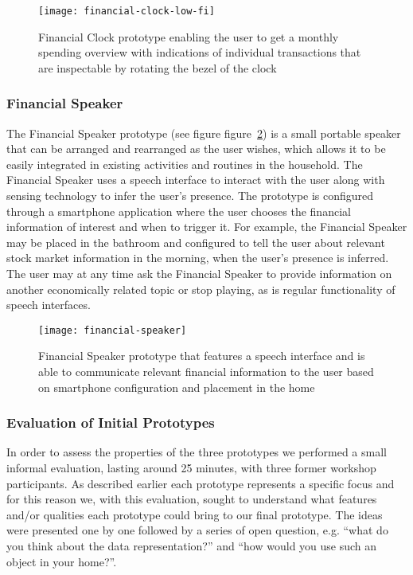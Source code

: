 \begin{figure}[h]
	\centering
	\texttt{[image: financial-clock-low-fi]}
	\caption{Financial Clock prototype enabling the user to get a monthly spending overview with indications of individual transactions that are inspectable by rotating the bezel of the clock}
	\label{fig:financial-clock-low-fi}
\end{figure}

\subsubsection*{Financial Speaker}
The Financial Speaker prototype (see figure figure~\ref{fig:financial-speaker}) is a small portable speaker that can be arranged and rearranged as the user wishes, which allows it to be easily integrated in existing activities and routines in the household. The Financial Speaker uses a speech interface to interact with the user along with sensing technology to infer the user’s presence. The prototype is configured through a smartphone application where the user chooses the financial information of interest and when to trigger it. For example, the Financial Speaker may be placed in the bathroom and configured to tell the user about relevant stock market information in the morning, when the user’s presence is inferred. The user may at any time ask the Financial Speaker to provide information on another economically related topic or stop playing, as is regular functionality of speech interfaces.

\begin{figure}[h]
	\centering
	\texttt{[image: financial-speaker]}
	\caption{Financial Speaker prototype that features a speech interface and is able to communicate relevant financial information to the user based on smartphone configuration and placement in the home}
	\label{fig:financial-speaker}
\end{figure}

\subsubsection*{Evaluation of Initial Prototypes}
\label{sec:evaluation-of-initial-prototypes}
In order to assess the properties of the three prototypes we performed a small informal evaluation, lasting around 25 minutes, with three former workshop participants. As described earlier each prototype represents a specific focus and for this reason we, with this evaluation, sought to understand what features and/or qualities each prototype could bring to our final prototype. The ideas were presented one by one followed by a series of open question, e.g. “what do you think about the data representation?” and “how would you use such an object in your home?”.

